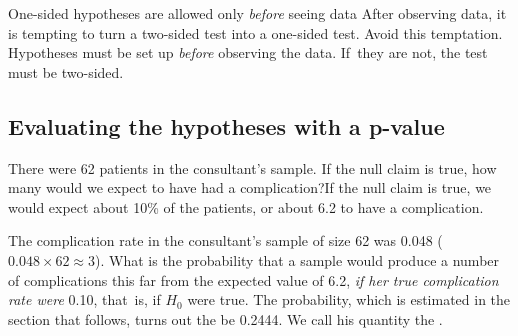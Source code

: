 
\begin{caution}{One-sided hypotheses are allowed only \emph{before} seeing data}
{After observing data, it is tempting to turn a two-sided test into a one-sided test. Avoid this temptation. Hypotheses must be set up \emph{before} observing the data. If~they are not, the test must be two-sided.}
\end{caution}


\subsection{Evaluating the hypotheses with a p-value}


\begin{example}
{There were 62 patients in the consultant's sample. If the null claim is true, how many would we expect to have had a complication?}If the null claim is true, we would expect about 10\% of the patients, or about 6.2 to have a complication.
\end{example}

The complication rate in the consultant's sample of size 62 was 0.048 ($0.048 \times 62 \approx 3$). What is the probability that a sample would produce a number of complications this far from the expected value of 6.2, \emph{if her true complication rate were} 0.10, that~is, if $H_0$ were true. The probability, which is estimated in the section that follows, turns out the be 0.2444. We call his quantity the .


